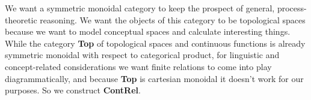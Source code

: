 \begin{fullwidth}
 We want a symmetric monoidal category to keep the prospect of general, process-theoretic reasoning. We want the objects of this category to be topological spaces because we want to model conceptual spaces and calculate interesting things. While the category \textbf{Top} of topological spaces and continuous functions is already symmetric monoidal with respect to categorical product, for linguistic and concept-related considerations we want finite relations to come into play diagrammatically, and because \textbf{Top} is cartesian monoidal it doesn't work for our purposes. So we construct \textbf{ContRel}.

\end{fullwidth}
